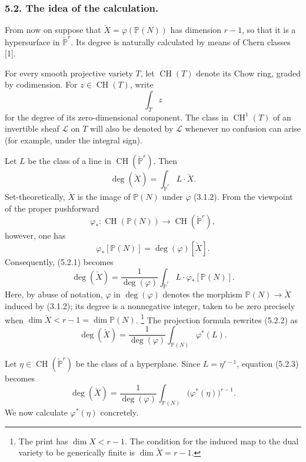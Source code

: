 \subsubsection*{5.2. The idea of the calculation.}

From now on suppose that
$\check X=\varphi(\mathbb P(N))$ has dimension $r-1$, so that it is a
hypersurface in $\check{\mathbb P}^{r}$.  Its degree is naturally
calculated by means of Chern classes [1].

For every smooth projective variety $T$, let $\operatorname{CH}(T)$
denote its Chow ring, graded by codimension.  For
$z\in\operatorname{CH}(T)$, write
\[
\int_T z
\]
for the degree of its zero-dimensional component.  The class in
$\operatorname{CH}^1(T)$ of an invertible sheaf $\mathcal L$ on $T$
will also be denoted by $\mathcal L$ whenever no confusion can arise
(for example, under the integral sign).

Let $L$ be the class of a line in
$\operatorname{CH}(\check{\mathbb P}^{r})$.  Then
\begin{equation}\tag{5.2.1}
\deg(\check X)
=\int_{\check{\mathbb P}^{r}}L\cdot\check X.
\end{equation}
Set-theoretically, $\check X$ is the image of $\mathbb P(N)$ under
$\varphi$ (3.1.2).  From the viewpoint of the proper pushforward
\[
\varphi_*:\operatorname{CH}(\mathbb P(N))
\longrightarrow\operatorname{CH}(\check{\mathbb P}^{r}),
\]
however, one has
\[
\varphi_*[\mathbb P(N)]=\deg(\varphi)[\check X].
\]
Consequently, (5.2.1) becomes
\begin{equation}\tag{5.2.2}
\deg(\check X)
=\frac{1}{\deg(\varphi)}
\int_{\check{\mathbb P}^{r}}L\cdot\varphi_*[\mathbb P(N)].
\end{equation}
Here, by abuse of notation, $\varphi$ in $\deg(\varphi)$ denotes the
morphism $\mathbb P(N)\to\check X$ induced by (3.1.2); its degree is a
nonnegative integer, taken to be zero precisely when
$\dim\check X<r-1=\dim\mathbb P(N)$.
\footnote{The print has $\dim X<r-1$.  The condition for the induced
map to the dual variety to be generically finite is
$\dim\check X=r-1$.}
The projection formula rewrites (5.2.2) as
\begin{equation}\tag{5.2.3}
\deg(\check X)
=\frac{1}{\deg(\varphi)}
\int_{\mathbb P(N)}\varphi^*(L).
\end{equation}

Let $\eta\in\operatorname{CH}(\check{\mathbb P}^{r})$ be the class of
a hyperplane.  Since $L=\eta^{r-1}$, equation (5.2.3) becomes
\begin{equation}\tag{5.2.4}
\deg(\check X)
=\frac{1}{\deg(\varphi)}
\int_{\mathbb P(N)}\bigl(\varphi^*(\eta)\bigr)^{r-1}.
\end{equation}
We now calculate $\varphi^*(\eta)$ concretely.

